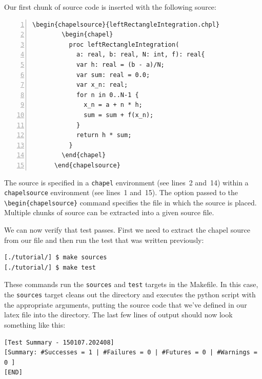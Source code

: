   \begin{seamlessnote}
    Our first chunk of source code is inserted with the following \latex source:
    \begin{Verbatim}[numbers=left,gobble=6]
      \begin{chapelsource}{leftRectangleIntegration.chpl}
        \begin{chapel}
          proc leftRectangleIntegration(
            a: real, b: real, N: int, f): real{
            var h: real = (b - a)/N; 
            var sum: real = 0.0;
            var x_n: real;
            for n in 0..N-1 {
              x_n = a + n * h;
              sum = sum + f(x_n);
            }
            return h * sum;
          }
        \end{chapel}
      \end{chapelsource}
    \end{Verbatim}
    The source is specified in a \verb|chapel| environment (see lines~2 and~14) within 
    a \verb|chapelsource| environment (see lines~1 and~15). The option passed to the
    \verb|\begin{chapelsource}| command specifies the file in which the source is placed.
    Multiple chunks of source can be extracted into a given source file.

    We can now verify that test  passes. First
    we need to extract the chapel source from our \latex file and then run the test that was
    written previously:
  \begin{verbatim}
[./tutorial/] $ make sources
[./tutorial/] $ make test
  \end{verbatim}
  These commands run the \verb|sources| and \verb|test| targets in the Makefile.
  In this case, the \verb|sources| target cleans out the  directory and
  executes the  python script with the appropriate arguments, putting
  the source code that we've defined in our latex file into the  directory.
  The last few lines of output should now look something like this:
  \begin{verbatim}
[Test Summary - 150107.202408]
[Summary: #Successes = 1 | #Failures = 0 | #Futures = 0 | #Warnings = 0 ]
[END]
  \end{verbatim}
\end{seamlessnote}


